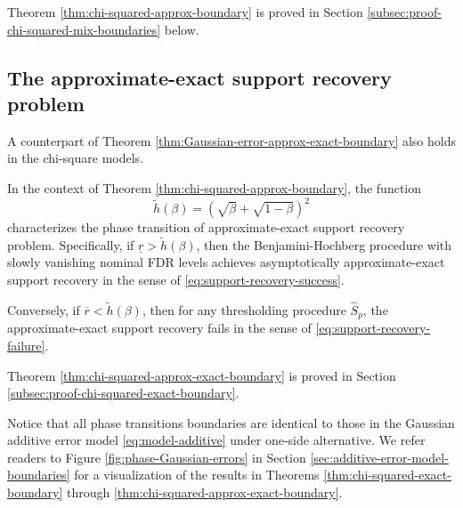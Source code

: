Theorem \ref{thm:chi-squared-approx-boundary} is proved in Section \ref{subsec:proof-chi-squared-mix-boundaries} below. 


\subsection{The approximate-exact support recovery problem}
\label{subsec:aprox-exact-support-recovery-chisq}

A counterpart of Theorem \ref{thm:Gaussian-error-approx-exact-boundary} also holds in the chi-square models.

\begin{theorem} \label{thm:chi-squared-approx-exact-boundary}
In the context of Theorem \ref{thm:chi-squared-approx-boundary}, the function 
\begin{equation} \label{eq:approx-exact-boundary-chisquared}
    \widetilde{h}(\beta) = \left(\sqrt{\beta} + \sqrt{1-\beta}\right)^2
\end{equation}
characterizes the phase transition of approximate-exact support recovery problem.
Specifically, if $\underline{r} > \widetilde{h}(\beta)$, then the Benjamini-Hochberg procedure with slowly vanishing nominal FDR levels achieves asymptotically approximate-exact support recovery in the sense of \eqref{eq:support-recovery-success}. 

Conversely, if $\overline{r} < \widetilde{h}(\beta)$, then for any thresholding procedure $\widehat{S}_p$, the approximate-exact support recovery fails in the sense of \eqref{eq:support-recovery-failure}.
\end{theorem}

Theorem \ref{thm:chi-squared-approx-exact-boundary} is proved in Section \ref{subsec:proof-chi-squared-exact-boundary}. 

Notice that all phase transitions boundaries are identical to those in the Gaussian additive error model \eqref{eq:model-additive} under one-side alternative.
We refer readers to Figure \ref{fig:phase-Gaussian-errors} in Section \ref{sec:additive-error-model-boundaries} for a visualization of the results in Theorems \ref{thm:chi-squared-exact-boundary} through \ref{thm:chi-squared-approx-exact-boundary}.

\medskip

